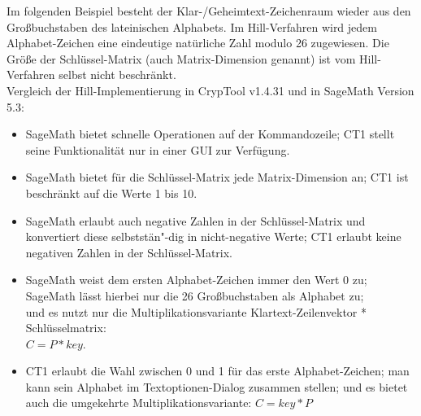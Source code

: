 \begin{refsegment}
\noindent Im folgenden Beispiel besteht der Klar-/Geheimtext-Zeichenraum wieder
aus den Großbuchstaben des lateinischen Alphabets. Im Hill-Verfahren wird
jedem Alphabet-Zeichen eine eindeutige natürliche Zahl modulo 26 zugewiesen.
Die Größe der Schlüssel-Matrix (auch Matrix-Dimension genannt) ist vom
Hill-Verfahren selbst nicht beschränkt.\\

 Vergleich der Hill-Implementierung in
CrypTool v1.4.31 und in SageMath Version 5.3:
\begin{itemize}
  \item SageMath bietet schnelle Operationen auf der Kommandozeile;
        CT1 stellt seine Funktionalität nur in einer GUI zur Verfügung.
  \item SageMath bietet für die Schlüssel-Matrix jede Matrix-Dimension an;
        CT1 ist beschränkt auf die Werte 1 bis 10.
  \item SageMath erlaubt auch negative Zahlen in der Schlüssel-Matrix
        und konvertiert diese selbststän"-dig in nicht-negative Werte;
        CT1 erlaubt keine negativen Zahlen in der Schlüssel-Matrix.
  \item SageMath weist dem ersten Alphabet-Zeichen immer den Wert 0 zu;\\
        SageMath lässt hierbei nur die 26 Großbuchstaben als Alphabet zu;\\
        und es nutzt nur die Multiplikationsvariante
        Klartext-Zeilenvektor * Schlüsselmatrix:\\
        $C = P * key$.
  \item CT1 erlaubt die Wahl zwischen 0 und 1 für das erste
        Alphabet-Zeichen; man kann sein Alphabet im Textoptionen-Dialog
        zusammen stellen; und es bietet auch die umgekehrte
        Multiplikationsvariante: $C = key * P$
\end{itemize}


\end{refsegment}
